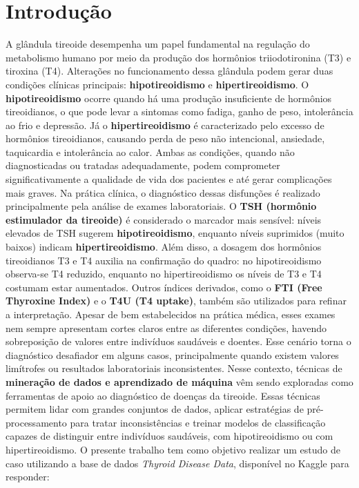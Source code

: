\documentclass[11pt]{article}
\begin{document}
\section{Introdução}
A glândula tireoide desempenha um papel fundamental na regulação do metabolismo humano por meio da produção dos hormônios triiodotironina (T3) e tiroxina (T4). Alterações no funcionamento dessa glândula podem gerar duas condições clínicas principais: \textbf{hipotireoidismo} e \textbf{hipertireoidismo}.  
O \textbf{hipotireoidismo} ocorre quando há uma produção insuficiente de hormônios tireoidianos, o que pode levar a sintomas como fadiga, ganho de peso, intolerância ao frio e depressão. Já o \textbf{hipertireoidismo} é caracterizado pelo excesso de hormônios tireoidianos, causando perda de peso não intencional, ansiedade, taquicardia e intolerância ao calor. Ambas as condições, quando não diagnosticadas ou tratadas adequadamente, podem comprometer significativamente a qualidade de vida dos pacientes e até gerar complicações mais graves.  
Na prática clínica, o diagnóstico dessas disfunções é realizado principalmente pela análise de exames laboratoriais. O \textbf{TSH (hormônio estimulador da tireoide)} é considerado o marcador mais sensível: níveis elevados de TSH sugerem \textbf{hipotireoidismo}, enquanto níveis suprimidos (muito baixos) indicam \textbf{hipertireoidismo}. Além disso, a dosagem dos hormônios tireoidianos T3 e T4 auxilia na confirmação do quadro: no hipotireoidismo observa-se T4 reduzido, enquanto no hipertireoidismo os níveis de T3 e T4 costumam estar aumentados. Outros índices derivados, como o \textbf{FTI (Free Thyroxine Index)} e o \textbf{T4U (T4 uptake)}, também são utilizados para refinar a interpretação.  
Apesar de bem estabelecidos na prática médica, esses exames nem sempre apresentam cortes claros entre as diferentes condições, havendo sobreposição de valores entre indivíduos saudáveis e doentes. Esse cenário torna o diagnóstico desafiador em alguns casos, principalmente quando existem valores limítrofes ou resultados laboratoriais inconsistentes.  
Nesse contexto, técnicas de \textbf{mineração de dados e aprendizado de máquina} vêm sendo exploradas como ferramentas de apoio ao diagnóstico de doenças da tireoide. Essas técnicas permitem lidar com grandes conjuntos de dados, aplicar estratégias de pré-processamento para tratar inconsistências e treinar modelos de classificação capazes de distinguir entre indivíduos saudáveis, com hipotireoidismo ou com hipertireoidismo.  
O presente trabalho tem como objetivo realizar um estudo de caso utilizando a base de dados \textit{Thyroid Disease Data}, disponível no Kaggle \cite{thyroid-dataset} para responder:
\end{document}
